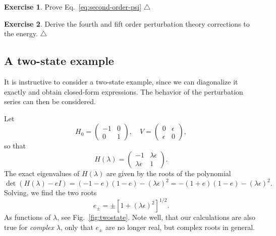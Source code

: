\documentclass{report}
\theoremstyle{plain}
\theoremstyle{definition}
\newtheorem{exerc}{Exercise}[chapter]
\newcommand\xqed[1]{%
  \leavevmode\unskip\penalty9999 \hbox{}\nobreak\hfill
  \quad\hbox{#1}}
\newcommand\demo{\xqed{$\triangle$}}
\newenvironment{exercise}{\bigskip\begin{exerc}}{\demo\end{exerc}\bigskip}
\begin{document}
\begin{exercise}
  Prove Eq.~\eqref{eq:second-order-psi}
\end{exercise}

\begin{exercise}
  Derive the fourth and fift order perturbation theory corrections to
  the energy.
\end{exercise}

\subsection{A two-state example}

It is instructive to consider a two-state example, since we can
diagonalize it exactly and obtain closed-form expressions. The
behavior of the perturbation series can then be considered.

Let
\begin{equation}
  H_0 = \begin{pmatrix} -1 & 0 \\ 0 & 1 \end{pmatrix}, \quad
  V = \begin{pmatrix} 0 & \epsilon \\ \epsilon & 0 \end{pmatrix},
\end{equation}
so that
\begin{equation}
  H(\lambda) = \begin{pmatrix} -1 & \lambda\epsilon \\ \lambda\epsilon
    & 1 \end{pmatrix}.
\end{equation}
The exact eigenvalues of $H(\lambda)$ are given by the roots of the polynomial
\begin{equation}
  \det(H(\lambda) - eI) = (-1-e)(1-e) - (\lambda\epsilon)^2 =
  -(1+e)(1-e) - (\lambda\epsilon)^2.
\end{equation}
Solving, we find the two roots
\begin{equation}
  e_{\pm} = \pm [1  + (\lambda\epsilon)^2]^{1/2}.
\end{equation}
As functions of $\lambda$, see Fig.~\ref{fig:twostate}. Note well,
that our calculations are also true for \emph{complex} $\lambda$, only
that $e_\pm$ are no longer real, but complex roots in general.
\end{document}
